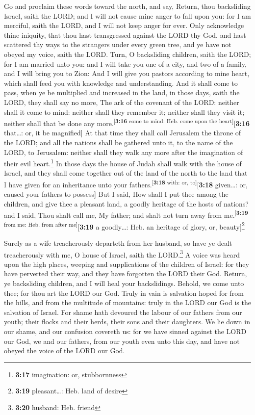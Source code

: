  Go and proclaim these words toward the north, and say,
Return, thou backsliding Israel, saith the LORD; and I will not cause
mine anger to fall upon you: for I am merciful, saith the LORD, and I
will not keep anger for ever.  Only acknowledge thine
iniquity, that thou hast transgressed against the LORD thy God, and hast
scattered thy ways to the strangers under every green tree, and ye have
not obeyed my voice, saith the LORD.  Turn, O backsliding
children, saith the LORD; for I am married unto you: and I will take you
one of a city, and two of a family, and I will bring you to Zion:
 And I will give you pastors according to mine heart,
which shall feed you with knowledge and understanding. 
And it shall come to pass, when ye be multiplied and increased in the
land, in those days, saith the LORD, they shall say no more, The ark of
the covenant of the LORD: neither shall it come to mind: neither shall
they remember it; neither shall they visit it; neither shall that be
done any more.\textsuperscript{{[}\textbf{3:16} come to mind: Heb. come
upon the heart{]}}{[}\textbf{3:16} that\ldots: or, it be magnified{]}
 At that time they shall call Jerusalem the throne of the
LORD; and all the nations shall be gathered unto it, to the name of the
LORD, to Jerusalem: neither shall they walk any more after the
imagination of their evil heart.\footnote{\textbf{3:17} imagination: or,
  stubbornness}  In those days the house of Judah shall
walk with the house of Israel, and they shall come together out of the
land of the north to the land that I have given for an inheritance unto
your fathers.\textsuperscript{{[}\textbf{3:18} with: or,
to{]}}{[}\textbf{3:18} given\ldots: or, caused your fathers to
possess{]}  But I said, How shall I put thee among the
children, and give thee a pleasant land, a goodly heritage of the hosts
of nations? and I said, Thou shalt call me, My father; and shalt not
turn away from me.\textsuperscript{{[}\textbf{3:19} from me: Heb. from
after me{]}}{[}\textbf{3:19} a goodly\ldots: Heb. an heritage of glory,
or, beauty{]}\footnote{\textbf{3:19} pleasant\ldots: Heb. land of desire}

 Surely as a wife treacherously departeth from her
husband, so have ye dealt treacherously with me, O house of Israel,
saith the LORD.\footnote{\textbf{3:20} husband: Heb. friend}
 A voice was heard upon the high places, weeping and
supplications of the children of Israel: for they have perverted their
way, and they have forgotten the LORD their God.  Return,
ye backsliding children, and I will heal your backslidings. Behold, we
come unto thee; for thou art the LORD our God.  Truly in
vain is salvation hoped for from the hills, and from the multitude of
mountains: truly in the LORD our God is the salvation of Israel.
 For shame hath devoured the labour of our fathers from
our youth; their flocks and their herds, their sons and their daughters.
 We lie down in our shame, and our confusion covereth us:
for we have sinned against the LORD our God, we and our fathers, from
our youth even unto this day, and have not obeyed the voice of the LORD
our God.

